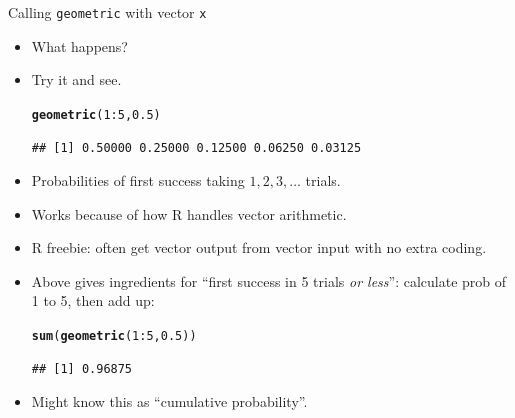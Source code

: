 \documentclass[unknownkeysallowed]{beamer}\usepackage[]{graphicx}\usepackage[]{color}
\makeatletter
\newcommand{\hlnum}[1]{\textcolor[rgb]{0.686,0.059,0.569}{#1}}%
\newcommand{\hlopt}[1]{\textcolor[rgb]{0,0,0}{#1}}%
\newcommand{\hlstd}[1]{\textcolor[rgb]{0.345,0.345,0.345}{#1}}%
\newcommand{\hlkwd}[1]{\textcolor[rgb]{0.737,0.353,0.396}{\textbf{#1}}}%
\newenvironment{kframe}{%
 \def\at@end@of@kframe{}%
 \ifinner\ifhmode%
  \def\at@end@of@kframe{\end{minipage}}%
  \begin{minipage}{\columnwidth}%
 \fi\fi%
 \def\FrameCommand##1{\hskip\@totalleftmargin \hskip-\fboxsep
 \colorbox{shadecolor}{##1}\hskip-\fboxsep
     \hskip-\linewidth \hskip-\@totalleftmargin \hskip\columnwidth}%
 \MakeFramed {\advance\hsize-\width
   \@totalleftmargin\z@ \linewidth\hsize
   \@setminipage}}%
 {\par\unskip\endMakeFramed%
 \at@end@of@kframe}
\newenvironment{knitrout}{}{} %
\makeatother
\begin{document}
\begin{frame}[fragile]{Calling \texttt{geometric} with vector
    \texttt{x}}

  \begin{itemize}
  \item What happens?
  \item Try it and see.
\begin{knitrout}
\color{fgcolor}\begin{kframe}
\begin{alltt}
\hlkwd{geometric}\hlstd{(}\hlnum{1}\hlopt{:}\hlnum{5}\hlstd{,}\hlnum{0.5}\hlstd{)}
\end{alltt}
\begin{verbatim}
## [1] 0.50000 0.25000 0.12500 0.06250 0.03125
\end{verbatim}
\end{kframe}
\end{knitrout}
\item Probabilities of first success taking $1, 2, 3, \ldots$ trials.
\item Works because of how R handles vector arithmetic.
\item R freebie: often get vector output from vector input with no
  extra coding.
\item Above gives ingredients for ``first success in 5 trials
  \emph{or less}'': calculate prob of 1 to 5, then add up:
\begin{knitrout}
\color{fgcolor}\begin{kframe}
\begin{alltt}
\hlkwd{sum}\hlstd{(}\hlkwd{geometric}\hlstd{(}\hlnum{1}\hlopt{:}\hlnum{5}\hlstd{,}\hlnum{0.5}\hlstd{))}
\end{alltt}
\begin{verbatim}
## [1] 0.96875
\end{verbatim}
\end{kframe}
\end{knitrout}
\item Might know this as ``cumulative probability''.
  \end{itemize}
  
\end{frame}
\end{document}
